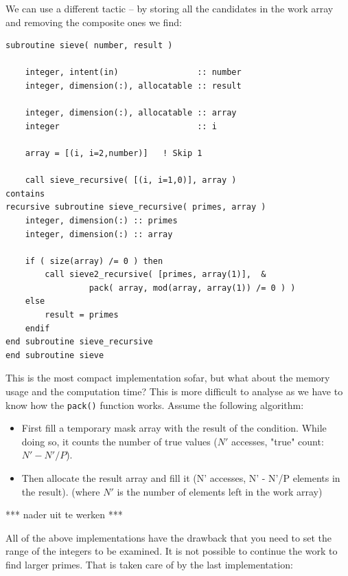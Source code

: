 \documentclass[onecolumn]{article}
\begin{document}
We can use a different tactic -- by storing all the candidates in the work array and removing the composite ones we find:

\begin{verbatim}
subroutine sieve( number, result )

    integer, intent(in)                :: number
    integer, dimension(:), allocatable :: result

    integer, dimension(:), allocatable :: array
    integer                            :: i

    array = [(i, i=2,number)]   ! Skip 1

    call sieve_recursive( [(i, i=1,0)], array )
contains
recursive subroutine sieve_recursive( primes, array )
    integer, dimension(:) :: primes
    integer, dimension(:) :: array

    if ( size(array) /= 0 ) then
        call sieve2_recursive( [primes, array(1)],  &
                 pack( array, mod(array, array(1)) /= 0 ) )
    else
        result = primes
    endif
end subroutine sieve_recursive
end subroutine sieve
\end{verbatim}

This is the most compact implementation sofar, but what about the memory usage and the computation time? This is more difficult to analyse as we have to know how the \verb+pack()+ function works. Assume the following algorithm:

\begin{itemize}
\item   First fill a temporary mask array with the result of the condition. While doing so, it counts the number of true values ($N'$ accesses, "true" count: $N' - N'/P$).
\item   Then allocate the result array and fill it (N' accesses, N' - N'/P elements in the result).
(where $N'$ is the number of elements left in the work array)
\end{itemize}

*** nader uit te werken ***

All of the above implementations have the drawback that you need to set the range of the integers to be examined. It is not possible to continue the work to find larger primes. That is taken care of by the last implementation:
\end{document}
